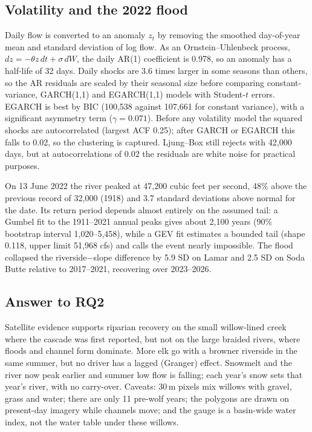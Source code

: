 \documentclass[11pt,a4paper]{article}
\begin{document}
\subsection{Volatility and the 2022 flood}
Daily flow is converted to an anomaly $z_t$ by removing the smoothed day-of-year mean and standard deviation of log flow. As an Ornstein--Uhlenbeck process, $dz=-\theta z\,dt+\sigma\,dW$, the daily AR(1) coefficient is 0.978, so an anomaly has a half-life of 32 days. Daily shocks are 3.6 times larger in some seasons than others, so the AR residuals are scaled by their seasonal size before comparing constant-variance, GARCH(1,1) and EGARCH(1,1) models with Student-$t$ errors. EGARCH is best by BIC (100{,}538 against 107{,}661 for constant variance), with a significant asymmetry term ($\gamma=0.071$). Before any volatility model the squared shocks are autocorrelated (largest ACF 0.25); after GARCH or EGARCH this falls to 0.02, so the clustering is captured. Ljung--Box still rejects with 42{,}000 days, but at autocorrelations of 0.02 the residuals are white noise for practical purposes.

On 13 June 2022 the river peaked at 47{,}200 cubic feet per second, 48\% above the previous record of 32{,}000 (1918) and 3.7 standard deviations above normal for the date. Its return period depends almost entirely on the assumed tail: a Gumbel fit to the 1911--2021 annual peaks gives about 2{,}100 years (90\% bootstrap interval 1{,}020--5{,}458), while a GEV fit estimates a bounded tail (shape 0.118, upper limit 51{,}968 cfs) and calls the event nearly impossible. The flood collapsed the riverside$-$slope difference by 5.9 SD on Lamar and 2.5 SD on Soda Butte relative to 2017--2021, recovering over 2023--2026.

\subsection{Answer to RQ2}
Satellite evidence supports riparian recovery on the small willow-lined creek where the cascade was first reported, but not on the large braided rivers, where floods and channel form dominate. More elk go with a browner riverside in the same summer, but no driver has a lagged (Granger) effect. Snowmelt and the river now peak earlier and summer low flow is falling; each year's snow sets that year's river, with no carry-over. Caveats: 30\,m pixels mix willows with gravel, grass and water; there are only 11 pre-wolf years; the polygons are drawn on present-day imagery while channels move; and the gauge is a basin-wide water index, not the water table under these willows.
\end{document}
